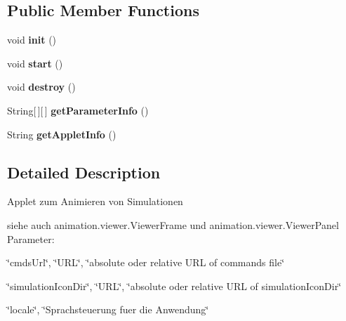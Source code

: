 \subsection*{Public Member Functions}
\begin{DoxyCompactItemize}
\item 
void {\bfseries init} ()\label{classdesmoj_1_1extensions_1_1visualization2d_1_1engine_1_1viewer_1_1_viewer_applet_a79e87c6b4d9781e4e67c237a59fae887}

\item 
void {\bfseries start} ()\label{classdesmoj_1_1extensions_1_1visualization2d_1_1engine_1_1viewer_1_1_viewer_applet_af95b01787147c2bb1e96449aa734ca17}

\item 
void {\bfseries destroy} ()\label{classdesmoj_1_1extensions_1_1visualization2d_1_1engine_1_1viewer_1_1_viewer_applet_a5a3b99e6cbd065e8d14e4e67bab9cb18}

\item 
String[$\,$][$\,$] {\bfseries get\-Parameter\-Info} ()\label{classdesmoj_1_1extensions_1_1visualization2d_1_1engine_1_1viewer_1_1_viewer_applet_a2982ab3c38bfd9785a6348900781a4a1}

\item 
String {\bfseries get\-Applet\-Info} ()\label{classdesmoj_1_1extensions_1_1visualization2d_1_1engine_1_1viewer_1_1_viewer_applet_a975890743ab06d3d83015ee947a83e93}

\end{DoxyCompactItemize}


\subsection{Detailed Description}
Applet zum Animieren von Simulationen\par
 siehe auch animation.\-viewer.\-Viewer\-Frame und animation.\-viewer.\-Viewer\-Panel Parameter\-:\par
 \char`\"{}cmds\-Url\char`\"{}, \char`\"{}\-U\-R\-L\char`\"{}, \char`\"{}absolute oder relative U\-R\-L of commands file\char`\"{}\par
 \char`\"{}simulation\-Icon\-Dir\char`\"{}, \char`\"{}\-U\-R\-L\char`\"{}, \char`\"{}absolute oder relative U\-R\-L of simulation\-Icon\-Dir\char`\"{}\par
 \char`\"{}locale\char`\"{}, \char`\"{}\-Sprachsteuerung fuer die Anwendung\char`\"{}\par


